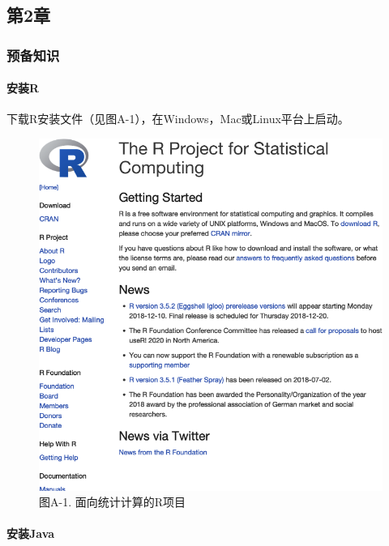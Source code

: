\documentclass[
]{article}
\begin{document}
\hypertarget{ux7b2c2ux7ae0}{%
\subsection{第2章}\label{ux7b2c2ux7ae0}}

\hypertarget{ux9884ux5907ux77e5ux8bc6}{%
\subsubsection{预备知识}\label{ux9884ux5907ux77e5ux8bc6}}

\hypertarget{ux5b89ux88c5r-1}{%
\paragraph{安装R}\label{ux5b89ux88c5r-1}}

下载R安装文件（见图A-1），在Windows，Mac或Linux平台上启动。

\begin{figure}
\centering
\includegraphics{figures/A_1.png}
\caption{图A-1. 面向统计计算的R项目}
\end{figure}

\hypertarget{ux5b89ux88c5java}{%
\paragraph{安装Java}\label{ux5b89ux88c5java}}
\end{document}
